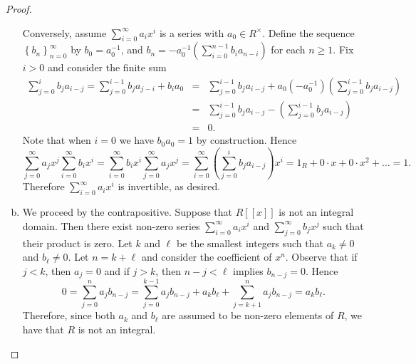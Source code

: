 \documentclass[10pt]{amsart}
\begin{document}
\begin{thm}
\begin{proof}
\begin{enumerate}[(a)]
      Conversely, assume $\sum_{i=0}^\infty a_ix^i$ is a series with $a_0 \in R^\times$.
      Define the sequence $\left\{b_n\right\}_{n=0}^\infty$ by $b_0 = a_0^{-1}$, and $b_n = -a_0^{-1}\left(\sum_{i=0}^{n-1} b_ia_{n-i}\right)$ for each $n \geq 1$.
      Fix $i > 0$ and consider the finite sum
      \begin{eqnarray*}
        \sum_{j=0}^i b_ja_{i-j} = \sum_{j=0}^{i-1} b_ja_{j-i} + b_ia_0 &=& \sum_{j=0}^{i-1} b_ja_{i-j} + a_0(-a_0^{-1})\left(\sum_{j=0}^{i-1} b_ja_{i-j}\right)\\
        &=& \sum_{j=0}^{i-1} b_ja_{i-j} - \left(\sum_{j=0}^{i-1} b_ja_{i-j}\right)\\
        &=& 0.
      \end{eqnarray*}
      Note that when $i = 0$ we have $b_0a_0 = 1$ by construction.
      Hence 
      $$\sum_{j=0}^\infty a_jx^j\sum_{i=0}^\infty b_ix^i = \sum_{i=0}^\infty b_ix^i \sum_{j=0}^\infty a_jx^j = \sum_{i=0}^\infty \left(\sum_{j=0}^i b_ja_{i-j}\right)x^i = 1_R + 0\cdot x + 0\cdot x^2 + \ldots = 1.$$
      Therefore $\sum_{i=0}^\infty a_ix^i$ is invertible, as desired.
    \item
      We proceed by the contrapositive.
      Suppose that $R[[x]]$ is not an integral domain.
      Then there exist non-zero series $\sum_{i=0}^\infty a_ix^i$ and $\sum_{j=0}^\infty b_jx^j$ such that their product is zero.
      Let $k$ and $\ell$ be the smallest integers such that $a_k \neq 0$ and $b_\ell \neq 0$.
      Let $n = k + \ell$ and consider the coefficient of $x^n$.
      Observe that if $j < k$, then $a_j = 0$ and if $j > k$, then $n - j < \ell$ implies $b_{n-j} = 0$.
      Hence
      $$0 = \sum_{j=0}^{n} a_jb_{n-j} = \sum_{j=0}^{k-1} a_jb_{n-j} + a_kb_\ell + \sum_{j=k+1}^n a_jb_{n-j} = a_kb_\ell.$$
      Therefore, since both $a_k$ and $b_\ell$ are assumed to be non-zero elements of $R$, we have that $R$ is not an integral.
    \end{enumerate}
  \end{proof}
\end{thm}
\end{document}
